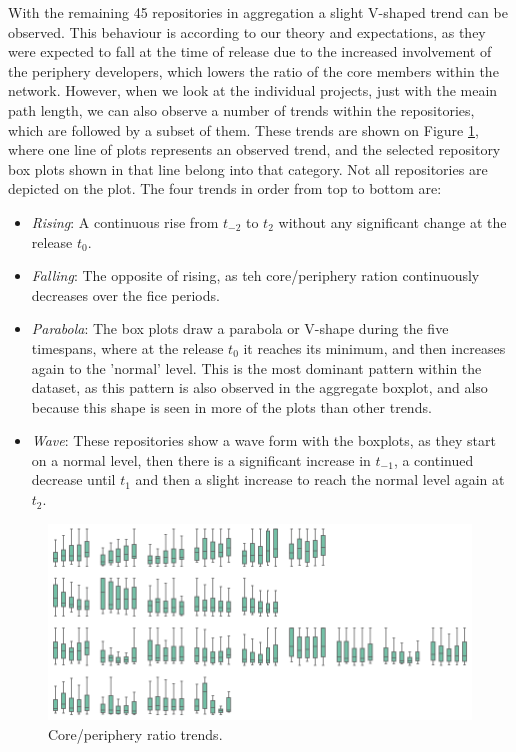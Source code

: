 With the remaining 45 repositories in aggregation a slight V-shaped trend can be observed. This behaviour is according to our theory and expectations, as they were expected to fall at the time of release due to the increased involvement of the periphery developers, which lowers the ratio of the core members within the network. However, when we look at the individual projects, just with the meain path length, we can also observe a number of trends within the repositories, which are followed by a subset of them. These trends are shown on Figure \ref{fig:cp-box-grid}, where one line of plots represents an observed trend, and the selected repository box plots shown in that line belong into that category. Not all repositories are depicted on the plot. The four trends in order from top to bottom are:

\begin{itemize}
    \item \textit{Rising}: A continuous rise from $t_{-2}$ to $t_2$ without any significant change at the release $t_0$.
    \item \textit{Falling}: The opposite of rising, as teh core/periphery ration continuously decreases over the fice periods.
    \item \textit{Parabola}: The box plots draw a parabola or V-shape during the five timespans, where at the release $t_0$ it reaches its minimum, and then increases again to the 'normal' level. This is the most dominant pattern within the dataset, as this pattern is also observed in the aggregate boxplot, and also because this shape is seen in more of the plots than other trends.
    \item \textit{Wave}: These repositories show a wave form with the boxplots, as they start on a normal level, then there is a significant increase in $t_{-1}$, a continued decrease until $t_1$ and then a slight increase to reach the normal level again at $t_2$.
\end{itemize}

\begin{figure}
    \centering
    \includegraphics[width=\textwidth]{figures/quantitative/boxplots/grid.png}
    \caption{Core/periphery ratio trends.}
    \label{fig:cp-box-grid}
\end{figure}


